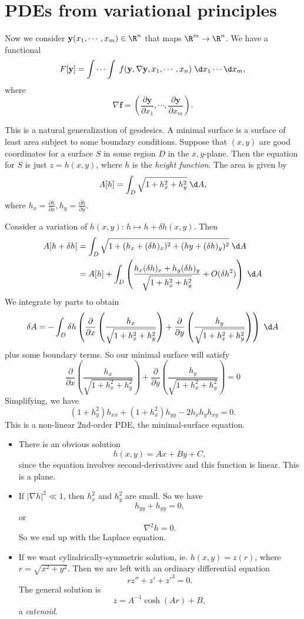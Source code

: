 \documentclass[a4paper]{article}
\begin{document}
\section{PDEs from variational principles}
Now we consider $\mathbf{y}(x_1, \cdots, x_m) \in \R^n$ that maps $\R^m \to \R^n$. We have a functional
\[
  F[\mathbf{y}] = \int\cdots \int \; f(\mathbf{y}, \nabla \mathbf{y}, x_1, \cdots, x_n)\;\d x_1\cdots \d x_m,
\]
where
\[
  \nabla \mathbf{f} = \left(\frac{\partial \mathbf{y}}{\partial x_1}, \cdots, \frac{\partial \mathbf{y}}{\partial x_m}\right).
\]
\begin{eg}
  This is a natural generalization of geodesics. A minimal surface is a surface of least area subject to some boundary conditions. Suppose that $(x, y)$ are good coordinates for a surface $S$ in some region $D$ in the $x,y$-plane. Then the equation for $S$ is just $z = h(x, y)$, where $h$ is the \emph{height function}. The area is given by
  \[
    A[h] = \int_D \sqrt{1 + h_x^2 + h_y^2}\;\d A,
  \]
  where $h_x = \frac{\partial h}{\partial x}, h_y = \frac{\partial h}{\partial y}$.

  Consider a variation of $h(x, y)$: $h\mapsto h + \delta h(x, y)$. Then
  \begin{align*}
    A[h + \delta h] &= \int_D \sqrt{1 + (h_x + (\delta h)_x)^2 + (hy + (\delta h)_y)^2}\;\d A\\
    &= A[h] + \int_D \left(\frac{h_x (\delta h)_x + h_y (\delta h)_y}{\sqrt{1 + h_x^2 + h_y^2}} + O(\delta h^2)\right)\;\d A
  \end{align*}
  We integrate by parts to obtain
  \[
    \delta A = -\int_D \delta h\left(\frac{\partial}{\partial x} \left(\frac{h_x}{\sqrt{1 + h_x^2 + h_y^2}}\right) + \frac{\partial}{\partial y} \left(\frac{h_y}{\sqrt{1 + h_x^2 + h_y^2}}\right)\right)\;\d A
  \]
  plus some boundary terms. So our minimal surface will satisfy
  \[
    \frac{\partial}{\partial x} \left(\frac{h_x}{\sqrt{1 + h_x^2 + h_y^2}}\right) + \frac{\partial}{\partial y} \left(\frac{h_y}{\sqrt{1 + h_x^2 + h_y^2}}\right) = 0
  \]
  Simplifying, we have
  \[
    (1 + h_y^2)h_{xx} + (1 + h_x^2) h_{yy} - 2h_xh_y h_{xy} = 0.
  \]
  This is a non-linear 2nd-order PDE, the minimal-surface equation.
  \begin{itemize}
    \item There is an obvious solution
      \[
        h(x, y) = Ax + By + C,
      \]
      since the equation involves second-derivatives and this function is linear. This is a plane.

    \item If $|\nabla h|^2 \ll 1$, then $h_x^2$ and $h_y^2$ are small. So we have
      \[
        h_{yy} + h_{yy} = 0,
      \]
      or
      \[
        \nabla^2 h = 0.
      \]
      So we end up with the Laplace equation.
    \item If we want cylindrically-symmetric solution, ie. $h(x, y) = z(r)$, where $r = \sqrt{x^2 + y^2}$. Then we are left with an ordinary differential equation
      \[
        rz'' + z' + z'^3 = 0.
      \]
      The general solution is
      \[
        z = A^{-1}\cosh (Ar) + B,
      \]
      a \emph{catenoid}.


\end{itemize}
\end{eg}
\end{document}
